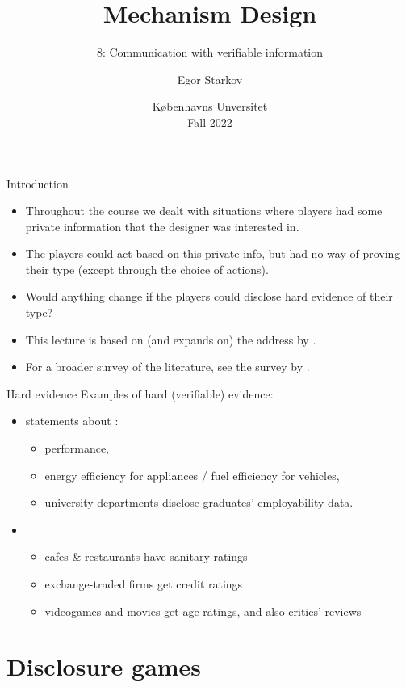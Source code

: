 \documentclass[english,10pt
,aspectratio=169
]{beamer}
\title{Mechanism Design}
\subtitle{8: Communication with verifiable information}
\author{Egor Starkov}
\date{K{\o}benhavns Unversitet \\
	Fall 2022}
\begin{document}
	\frame[plain]{\titlepage}



\begin{frame}{Introduction}
\begin{itemize}
	\item Throughout the course we dealt with situations where players had some private information that the designer was interested in.
	\item The players could act based on this private info, but had no way of proving their type (except through the choice of actions).
	\item Would anything change if the players could \alert{disclose hard evidence} of their type?
	\item This lecture is based on (and expands on) the address by \cite{dekel_evidence_2016}.
	\item For a broader survey of the literature, see the survey by \cite{dranove_quality_2010}.
\end{itemize}
\end{frame}


\begin{frame}{Hard evidence}
	Examples of hard (verifiable) evidence:
	\begin{itemize}
		\item statements about :
		\begin{itemize}
			\item performance, 
			\item energy efficiency for appliances / fuel efficiency for vehicles,
			\item university departments disclose graduates' employability data.
		\end{itemize}
		\item {} 
		\begin{itemize}
			\item cafes \& restaurants have sanitary ratings
			\item exchange-traded firms get credit ratings
			\item videogames and movies get age ratings, and also critics' reviews
		\end{itemize}
	\end{itemize}
\end{frame}


\section{Disclosure games}
\end{document}
